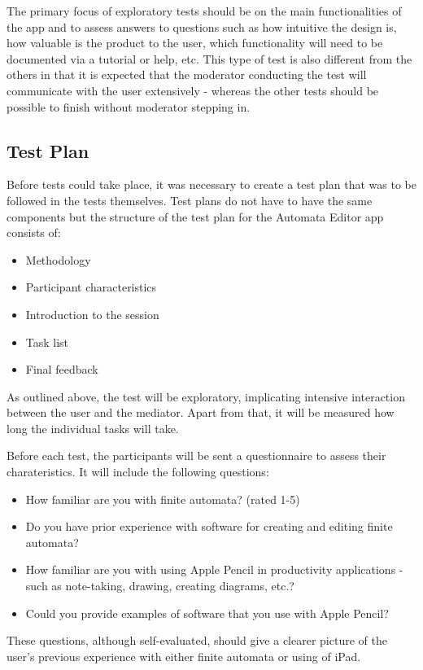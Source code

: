 The primary focus of exploratory tests should be on the main functionalities of the app and to assess answers to questions such as how intuitive the design is, how valuable is the product to the user, which functionality will need to be documented via a tutorial or help, etc. This type of test is also different from the others in that it is expected that the moderator conducting the test will communicate with the user extensively - whereas the other tests should be possible to finish without moderator stepping in.

\subsection{Test Plan}

Before tests could take place, it was necessary to create a test plan that was to be followed in the tests themselves. Test plans do not have to have the same components but the structure of the test plan for the Automata Editor app consists of:
\begin{itemize}
    \item Methodology
    \item Participant characteristics
    \item Introduction to the session
    \item Task list
    \item Final feedback
\end{itemize}

As outlined above, the test will be exploratory, implicating intensive interaction between the user and the mediator. Apart from that, it will be measured how long the individual tasks will take.

Before each test, the participants will be sent a questionnaire to assess their charateristics. It will include the following questions:
\begin{itemize}
    \item How familiar are you with finite automata? (rated 1-5)
    \item Do you have prior experience with software for creating and editing finite automata?
    \item How familiar are you with using Apple Pencil in productivity applications - such as note-taking, drawing, creating diagrams, etc.?
    \item Could you provide examples of software that you use with Apple Pencil?
\end{itemize}
These questions, although self-evaluated, should give a clearer picture of the user's previous experience with either finite automata or using of iPad.

